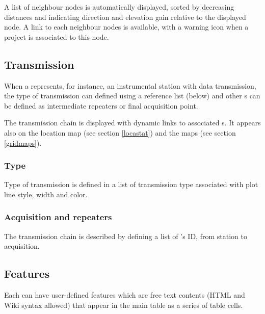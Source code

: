 A list of neighbour nodes is automatically displayed, sorted by decreasing distances and indicating direction and elevation gain relative to the displayed node. A link to each neighbour nodes is available, with a warning icon when a project is associated to this node. 

\subsection{Transmission}

When a  represents, for instance, an instrumental station with data transmission, the type of transmission can defined using a reference list (below) and other s can be defined as intermediate repeaters or final acquisition point.

The transmission chain is displayed with dynamic links to associated s. It appears also on the location map (see section \ref{locastat}) and the  maps (see section \ref{gridmaps}).

\subsubsection{Type}

Type of transmission is defined in a list of transmission type associated with plot line style, width and color.




\subsubsection{Acquisition and repeaters}

The transmission chain is described by defining a list of 's ID, from station to acquisition.


\subsection{Features}

Each  can have user-defined features which are free text contents (HTML and Wiki syntax allowed) that appear in the main table as a series of table cells.


